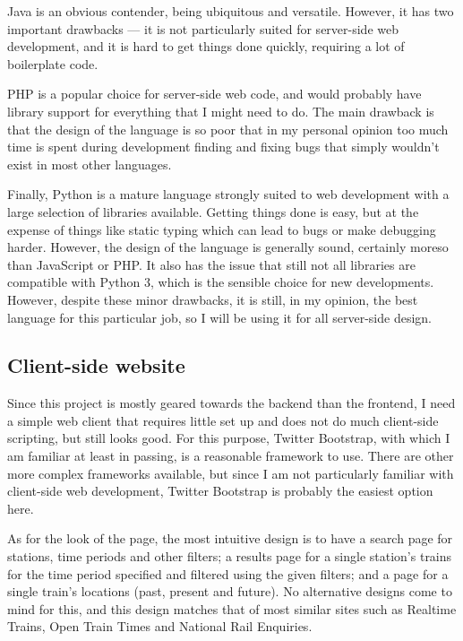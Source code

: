 \documentclass[a4paper,12pt]{article}
\begin{document}
Java is an obvious contender, being ubiquitous and versatile. However, it has
two important drawbacks --- it is not particularly suited for server-side web
development, and it is hard to get things done quickly, requiring a lot of
boilerplate code.

PHP is a popular choice for server-side web code, and would probably have
library support for everything that I might need to do. The main drawback is
that the design of the language is so poor that in my personal opinion too much
time is spent during development finding and fixing bugs that simply wouldn't
exist in most other languages.

Finally, Python is a mature language strongly suited to web development with a
large selection of libraries available. Getting things done is easy, but at the
expense of things like static typing which can lead to bugs or make debugging
harder. However, the design of the language is generally sound, certainly
moreso than JavaScript or PHP. It also has the issue that still not all
libraries are compatible with Python 3, which is the sensible choice for new
developments. However, despite these minor drawbacks, it is still, in my
opinion, the best language for this particular job, so I will be using it for
all server-side design.

\subsection{Client-side website}

Since this project is mostly geared towards the backend than the frontend, I
need a simple web client that requires little set up and does not do much
client-side scripting, but still looks good. For this purpose, Twitter
Bootstrap, with which I am familiar at least in passing, is a reasonable
framework to use. There are other more complex frameworks available, but since
I am not particularly familiar with client-side web development, Twitter
Bootstrap is probably the easiest option here.

As for the look of the page, the most intuitive design is to have a search page
for stations, time periods and other filters; a results page for a single
station's trains for the time period specified and filtered using the given
filters; and a page for a single train's locations (past, present and future).
No alternative designs come to mind for this, and this design matches that of
most similar sites such as Realtime Trains, Open Train Times and National Rail
Enquiries.
\end{document}
